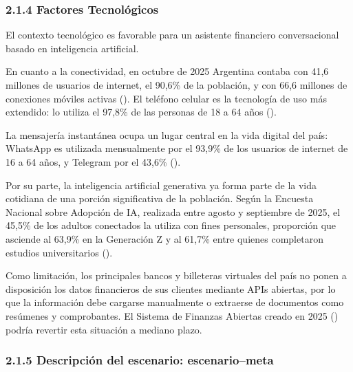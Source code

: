 \subsubsection*{2.1.4 Factores
Tecnológicos}\label{factores-tecnoluxf3gicos}

El contexto tecnológico es favorable para un asistente financiero
conversacional basado en inteligencia artificial.

En cuanto a la conectividad, en octubre de 2025 Argentina contaba con
41,6 millones de usuarios de internet, el 90,6\% de la población, y con
66,6 millones de conexiones móviles activas
(). El teléfono celular es la
tecnología de uso más extendido: lo utiliza el 97,8\% de las personas de
18 a 64 años ().

La mensajería instantánea ocupa un lugar central en la vida digital del
país: WhatsApp es utilizada mensualmente por el 93,9\% de los usuarios
de internet de 16 a 64 años, y Telegram por el 43,6\%
().

Por su parte, la inteligencia artificial generativa ya forma parte de la
vida cotidiana de una porción significativa de la población. Según la
Encuesta Nacional sobre Adopción de IA, realizada entre agosto y
septiembre de 2025, el 45,5\% de los adultos conectados la utiliza con
fines personales, proporción que asciende al 63,9\% en la Generación Z y
al 61,7\% entre quienes completaron estudios universitarios
().

Como limitación, los principales bancos y billeteras virtuales del país
no ponen a disposición los datos financieros de sus clientes mediante
APIs abiertas, por lo que la información debe cargarse manualmente o
extraerse de documentos como resúmenes y comprobantes. El Sistema de
Finanzas Abiertas creado en 2025 () podría revertir esta situación a mediano plazo.

\subsubsection*{2.1.5 Descripción del escenario:
escenario--meta}\label{descripciuxf3n-del-escenario-escenariometa}

